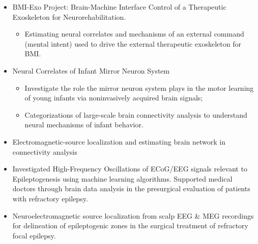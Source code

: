 \documentclass[10pt,letterpaper,sans]{moderncv}   %
\begin{document}
{{\begin{itemize} 
            \item BMI-Exo Project: Brain-Machine Interface Control of a Therapeutic Exoskeleton for Neurorehabilitation.  
            \begin{itemize}
                \item Estimating neural correlates and mechanisms of an external command (mental intent) used to drive the external therapeutic exoskeleton for BMI.
            \end{itemize}
            \vspace{3pt}
            \item Neural Correlates of Infant Mirror Neuron System 
            \begin{itemize}
                \item Investigate the role the mirror neuron system plays in the motor learning of young infants via noninvasively acquired brain signals; 
                \item Categorizations of large-scale brain connectivity analysis to understand neural mechanisms of infant behavior.
            \end{itemize}
            \item Electromagnetic-source localization and estimating brain network in connectivity analysis 
        \end{itemize}
    }}\vspace{10pt}

{{\begin{itemize} 
\item Investigated High-Frequency Oscillations of ECoG/EEG signals relevant to Epileptogenesis using machine learning algorithms. Supported medical doctors through brain data analysis in the presurgical evaluation of patients with refractory epilepsy.
\item Neuroelectromagnetic source localization from scalp EEG \& MEG recordings for delineation of epileptogenic zones in the surgical treatment of refractory focal epilepsy.
\end{itemize}
}} 
\end{document}
